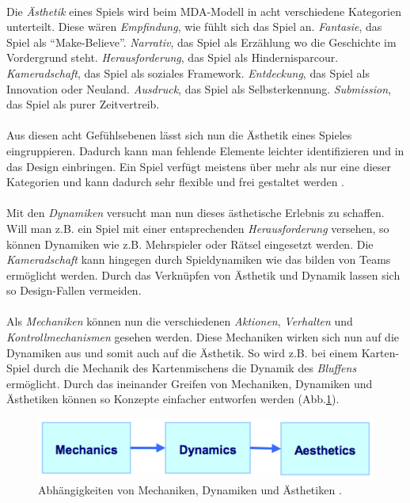 \documentclass[a4paper,12pt,twoside]{scrartcl}
\begin{document}
\\
Die \textit{Ästhetik} eines Spiels wird beim MDA-Modell in acht verschiedene Kategorien unterteilt. Diese wären \textit{Empfindung}, wie fühlt sich das Spiel an. \textit{Fantasie}, das Spiel als \enquote{Make-Believe}. \textit{Narrativ}, das Spiel als Erzählung wo die Geschichte im Vordergrund steht. \textit{Herausforderung}, das Spiel als Hindernisparcour. \textit{Kameradschaft}, das Spiel als soziales Framework. \textit{Entdeckung}, das Spiel als Innovation oder Neuland. \textit{Ausdruck}, das Spiel als Selbsterkennung. \textit{Submission}, das Spiel als purer Zeitvertreib.
\\\\
Aus diesen acht Gefühlsebenen lässt sich nun die Ästhetik eines Spieles eingruppieren. Dadurch kann man fehlende Elemente leichter identifizieren und in das Design einbringen. Ein Spiel verfügt meistens über mehr als nur eine dieser Kategorien und kann dadurch sehr flexible und frei gestaltet werden \cite{Hunicke2004}.
\\\\
Mit den \textit{Dynamiken} versucht man nun dieses ästhetische Erlebnis zu schaffen. Will man z.B. ein Spiel mit einer entsprechenden \textit{Herausforderung} versehen, so können Dynamiken wie z.B. Mehrspieler oder Rätsel eingesetzt werden. Die \textit{Kameradschaft} kann hingegen durch Spieldynamiken wie das bilden von Teams ermöglicht werden. Durch das Verknüpfen von Ästhetik und Dynamik lassen sich so Design-Fallen vermeiden.
\\\\
Als \textit{Mechaniken} können nun die verschiedenen \textit{Aktionen}, \textit{Verhalten} und \textit{Kontrollmechanismen} gesehen werden. Diese Mechaniken wirken sich nun auf die Dynamiken aus und somit auch auf die Ästhetik. So wird z.B. bei einem Karten-Spiel durch die Mechanik des Kartenmischens die Dynamik des \textit{Bluffens} ermöglicht. Durch das ineinander Greifen von Mechaniken, Dynamiken und Ästhetiken können so Konzepte einfacher entworfen werden (Abb.\ref{MDABild}). 
\begin{figure}[h!]
\begin{center}
\includegraphics[scale = 1.0]{Bilder/MDA.eps}
\caption{Abhängigkeiten von Mechaniken, Dynamiken und Ästhetiken \cite{Hunicke2004}.}
\label{MDABild}
\end{center}
\end{figure}
\end{document}
